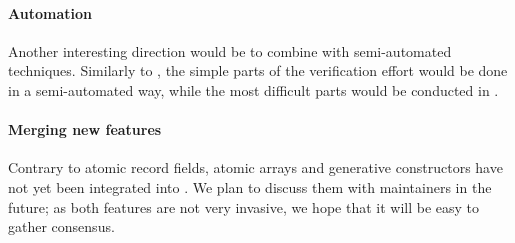 \paragraph{Automation}

Another interesting direction would be to combine \Zoo with semi-automated techniques.
Similarly to \WhyThree, the simple parts of the verification effort would be done in a semi-automated way, while the most difficult parts would be conducted in \Rocq.

\paragraph{Merging new features}

Contrary to atomic record fields, atomic arrays and generative constructors have not yet been integrated into \OCaml.
We plan to discuss them with \OCaml maintainers in the future; as both features are not very invasive, we hope that it will be easy to gather consensus.
